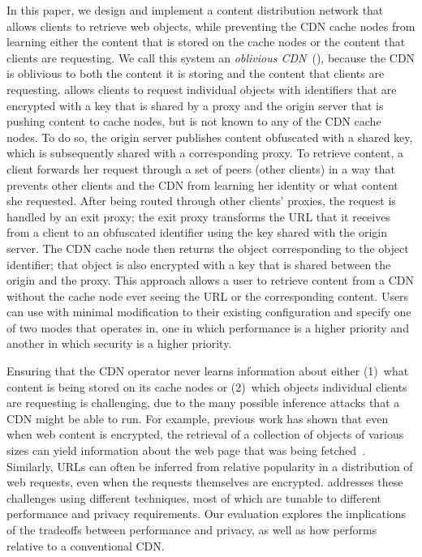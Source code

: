 In this paper, we design and implement a content distribution network that
allows clients to retrieve web objects, while preventing the CDN cache nodes
from learning either the content that is stored on the cache nodes or the
content that clients are requesting. We call this system an {\em oblivious
CDN}~(\system{}), because the CDN is oblivious to both the content it is
storing and the content that clients are requesting. \system{} allows clients to
request individual objects with identifiers that are encrypted with a key that
is shared by a proxy and the origin server that is pushing content to
cache nodes, but is not known to any of the CDN cache nodes.  To do so, the
origin server publishes content obfuscated with a shared key, which is subsequently 
shared with a corresponding proxy. To retrieve content, a client forwards her request 
through a set of peers (other clients) in a way that prevents other clients 
and the CDN from learning her identity or what content she requested.  After being routed 
through other clients' proxies, the request is handled by an exit proxy; the exit proxy 
transforms the URL that it receives
from a client to an obfuscated identifier using the key shared with the origin
server. The CDN cache node then returns the object corresponding to the object
identifier; that object is also encrypted with a key that is shared between
the origin and the proxy. This approach allows a user to retrieve content from
a CDN without the cache node ever seeing the URL or the corresponding content.
Users can use \system{} with minimal modification to their existing configuration and
specify one of two modes that \system{} operates in, one in which performance is a higher 
priority and another in which security is a higher priority.

Ensuring that the CDN operator never
learns information about either (1)~what content is being stored on its cache
nodes or (2)~which objects individual clients are requesting is
challenging, due to the many possible inference attacks that a CDN might be
able to run. For example, previous work has shown that even when web content
is encrypted, the retrieval of a collection of objects of various sizes can
yield information about the web page that was being fetched~\cite{panchenko2016website,
cai2012touching}. Similarly, URLs
can often be inferred from relative popularity in a distribution of web
requests, even when the requests themselves are encrypted. \system{} addresses
these challenges using different techniques, most of which are tunable to different 
performance and privacy requirements.  Our evaluation explores the implications of 
the tradeoffs between performance and privacy, as
well as how \system{} performs relative to a conventional CDN.

